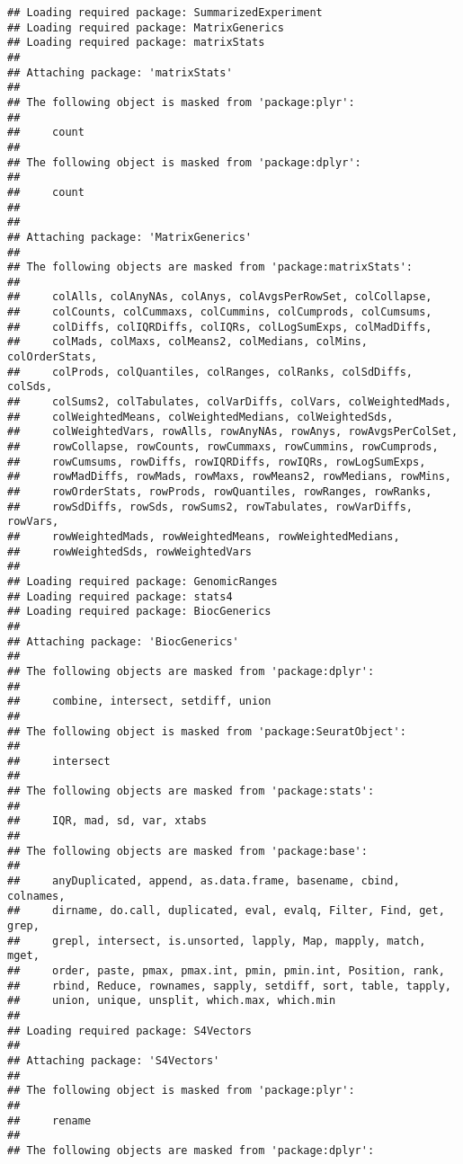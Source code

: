 \documentclass[
]{article}
\begin{document}
\begin{verbatim}
## Loading required package: SummarizedExperiment
## Loading required package: MatrixGenerics
## Loading required package: matrixStats
## 
## Attaching package: 'matrixStats'
## 
## The following object is masked from 'package:plyr':
## 
##     count
## 
## The following object is masked from 'package:dplyr':
## 
##     count
## 
## 
## Attaching package: 'MatrixGenerics'
## 
## The following objects are masked from 'package:matrixStats':
## 
##     colAlls, colAnyNAs, colAnys, colAvgsPerRowSet, colCollapse,
##     colCounts, colCummaxs, colCummins, colCumprods, colCumsums,
##     colDiffs, colIQRDiffs, colIQRs, colLogSumExps, colMadDiffs,
##     colMads, colMaxs, colMeans2, colMedians, colMins, colOrderStats,
##     colProds, colQuantiles, colRanges, colRanks, colSdDiffs, colSds,
##     colSums2, colTabulates, colVarDiffs, colVars, colWeightedMads,
##     colWeightedMeans, colWeightedMedians, colWeightedSds,
##     colWeightedVars, rowAlls, rowAnyNAs, rowAnys, rowAvgsPerColSet,
##     rowCollapse, rowCounts, rowCummaxs, rowCummins, rowCumprods,
##     rowCumsums, rowDiffs, rowIQRDiffs, rowIQRs, rowLogSumExps,
##     rowMadDiffs, rowMads, rowMaxs, rowMeans2, rowMedians, rowMins,
##     rowOrderStats, rowProds, rowQuantiles, rowRanges, rowRanks,
##     rowSdDiffs, rowSds, rowSums2, rowTabulates, rowVarDiffs, rowVars,
##     rowWeightedMads, rowWeightedMeans, rowWeightedMedians,
##     rowWeightedSds, rowWeightedVars
## 
## Loading required package: GenomicRanges
## Loading required package: stats4
## Loading required package: BiocGenerics
## 
## Attaching package: 'BiocGenerics'
## 
## The following objects are masked from 'package:dplyr':
## 
##     combine, intersect, setdiff, union
## 
## The following object is masked from 'package:SeuratObject':
## 
##     intersect
## 
## The following objects are masked from 'package:stats':
## 
##     IQR, mad, sd, var, xtabs
## 
## The following objects are masked from 'package:base':
## 
##     anyDuplicated, append, as.data.frame, basename, cbind, colnames,
##     dirname, do.call, duplicated, eval, evalq, Filter, Find, get, grep,
##     grepl, intersect, is.unsorted, lapply, Map, mapply, match, mget,
##     order, paste, pmax, pmax.int, pmin, pmin.int, Position, rank,
##     rbind, Reduce, rownames, sapply, setdiff, sort, table, tapply,
##     union, unique, unsplit, which.max, which.min
## 
## Loading required package: S4Vectors
## 
## Attaching package: 'S4Vectors'
## 
## The following object is masked from 'package:plyr':
## 
##     rename
## 
## The following objects are masked from 'package:dplyr':

\end{verbatim}
\end{document}
